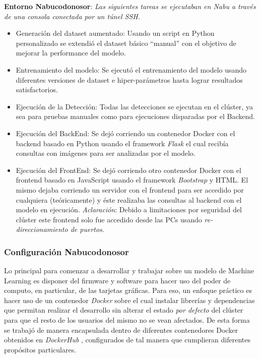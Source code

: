 \textbf{Entorno Nabucodonosor}:
\textit{Las siguientes tareas se ejecutaban en \textit{Nabu} a través de una consola conectada por un túnel SSH.}
\begin{itemize}
    \item Generación del dataset aumentado: Usando un script en Python personalizado se extendió el dataset básico ``manual'' con el objetivo de mejorar la performance del modelo. 
    \item Entrenamiento del modelo: Se ejecutó el entrenamiento del modelo usando diferentes versiones de dataset e hiper-parámetros hasta lograr resultados satisfactorios.
    \item Ejecución de la Detección: Todas las detecciones se ejecutan en el clúster, ya sea para pruebas manuales como para ejecuciones disparadas por el Backend.
    \item Ejecución del BackEnd: Se dejó corriendo un contenedor Docker con el backend basado en Python usando el framework \textit{Flask} el cual recibía consultas con imágenes para ser analizadas por el modelo.
    \item Ejecución del FrontEnd: Se dejó corriendo otro contenedor Docker con el frontend basado en JavaScript usando el framework \textit{Bootstrap} y HTML. El mismo dejaba corriendo un servidor con el frontend para ser accedido por cualquiera (teóricamente) y éste realizaba las consultas al backend con el modelo en ejecución. \textit{Aclaración}: Debido a limitaciones por seguridad del clúster este frontend solo fue accedido desde las PCs usando \textit{re-direccionamiento de puertos}.
\end{itemize}

\subsubsection{Configuración Nabucodonosor}
Lo principal para comenzar a desarrollar y trabajar sobre un modelo de Machine Learning es disponer del firmware y software para hacer uso del poder de computo, en particular, de las tarjetas gráficas. Para eso, un enfoque práctico es hacer uso de un contenedor \textit{Docker} sobre el cual  instalar librerías y dependencias que permitan realizar el desarrollo sin alterar el estado \textit{por defecto} del clúster para que el resto de los usuarios del mismo no se vean afectados. De esta forma se trabajó de manera encapsulada dentro de diferentes contenedores Docker obtenidos en \textit{DockerHub} \cite{dockerhub}, configurados de tal manera que cumplieran diferentes propósitos particulares.\\

